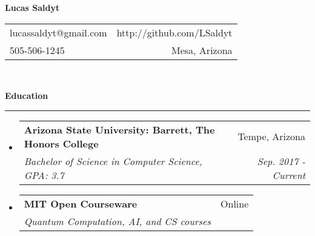 \documentclass[letterpaper,11pt]{article}
\makeatletter
\newcommand{\sectionline}{
    \noindent\rule[0.5ex]{\linewidth}{0.5pt}
}
\newcommand{\resitem}[1]{\item #1 \vspace{-3pt}}
\newcommand{\resheading}[1]{
    {\large \textbf{#1}}
    \sectionline
}
\newcommand{\colfill}{@{\extracolsep{\fill}}}
\newcommand{\ressubheading}[4]{
\begin{tabular*}{6.5in}{l\colfill r}
		\textbf{#1} & #2 \\
		\textit{#3} & \textit{#4} \\
\end{tabular*}\vspace{-6pt}}
\makeatother
\begin{document}
\begin{center}
\textbf{\Large Lucas Saldyt}
\end{center}
\begin{tabular*}{7in}{l \colfill r}
lucassaldyt@gmail.com & http://github.com/LSaldyt\\
505-506-1245 & Mesa, Arizona \\
\end{tabular*}
\\

\vspace{0.1in}

\resheading{Education}
\begin{itemize}
\item
    \ressubheading{Arizona State University: Barrett, The Honors College}{Tempe, Arizona}{Bachelor of Science in Computer Science, GPA: 3.7}{Sep. 2017 - Current}
\item
    \ressubheading{MIT Open Courseware}{Online}{Quantum Computation, AI, and CS courses}{}

\end{itemize}

\vspace{0.1in}
\end{document}
